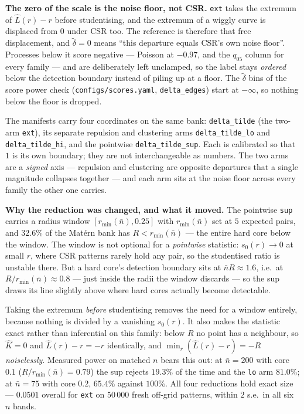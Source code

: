 \documentclass[11pt]{article}
\newcommand{\dt}{\tilde\delta}
\newcommand{\nb}{\bar n}
\newcommand{\rmin}{r_{\min}(\nb)}
\newcommand{\code}[1]{\texttt{#1}}
\begin{document}
\textbf{The zero of the scale is the noise floor, not CSR.} \code{ext} takes the extremum of $\hat L(r)-r$ before studentising, and the extremum of a wiggly curve is displaced from $0$ under CSR too. The reference is therefore that free displacement, and $\dt=0$ means ``this departure equals CSR's own noise floor''. Processes below it score negative --- Poisson at $-0.97$, and the $q_{05}$ column for every family --- and are deliberately left unclamped, so the label stays \emph{ordered} below the detection boundary instead of piling up at a floor. The $\dt$ bins of the score power check (\code{configs/scores.yaml}, \code{delta\_edges}) start at $-\infty$, so nothing below the floor is dropped.

The manifests carry four coordinates on the same bank: \code{delta\_tilde} (the two-arm \code{ext}), its separate repulsion and clustering arms \code{delta\_tilde\_lo} and \code{delta\_tilde\_hi}, and the pointwise \code{delta\_tilde\_sup}. Each is calibrated so that $1$ is its own boundary; they are not interchangeable as numbers. The two arms are a \emph{signed} axis --- repulsion and clustering are opposite departures that a single magnitude collapses together --- and each arm sits at the noise floor across every family the other one carries.

\textbf{Why the reduction was changed, and what it moved.} The pointwise \code{sup} carries a radius window $[\rmin,0.25]$ with $\rmin$ set at $5$ expected pairs, and $32.6\%$ of the Mat\'ern bank has $R<\rmin$ --- the entire hard core below the window. The window is not optional for a \emph{pointwise} statistic: $s_0(r)\to0$ at small $r$, where CSR patterns rarely hold any pair, so the studentised ratio is unstable there. But a hard core's detection boundary sits at $\nb R\approx1.6$, i.e.\ at $R/\rmin\approx0.8$ --- just inside the radii the window discards --- so the sup draws its line slightly above where hard cores actually become detectable.

Taking the extremum \emph{before} studentising removes the need for a window entirely, because nothing is divided by a vanishing $s_0(r)$. It also makes the statistic exact rather than inferential on this family: below $R$ no point has a neighbour, so $\hat K=0$ and $\hat L(r)-r=-r$ identically, and $\min_r(\hat L(r)-r)=-R$ \emph{noiselessly}. Measured power on matched $n$ bears this out: at $\nb=200$ with core $0.1$ ($R/\rmin=0.79$) the sup rejects $19.3\%$ of the time and the \code{lo} arm $81.0\%$; at $\nb=75$ with core $0.2$, $65.4\%$ against $100\%$. All four reductions hold exact size --- $0.0501$ overall for \code{ext} on $50\,000$ fresh off-grid patterns, within $2$ s.e.\ in all six $n$ bands.
\end{document}
